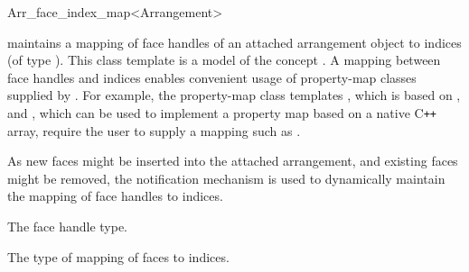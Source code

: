 
\ccRefPageBegin

\begin{ccRefClass}{Arr_face_index_map<Arrangement>}
\label{arr_ref:arr_face_index_map}

\ccDefinition

\ccClassTemplateName{} maintains a mapping of face handles of an
attached arrangement object to indices (of type ).
This class template is a model of the \boost{} concept
. A mapping between face handles and indices
enables convenient usage of property-map classes supplied by \boost{}.
For example, the property-map class templates
, which is based on ,
and , which can be used to implement
a property map based on a native C\hbox{\tt ++} array, require the
user to supply a mapping such as \ccClassTemplateName{}.

As new faces might be inserted into the attached arrangement, and
existing faces might be removed, the notification mechanism is used
to dynamically maintain the mapping of face handles to indices.


\ccIsModel
  
\ccInheritsFrom{}


\ccTypes


\ccGlue
{}
\ccGlue
{}
\ccGlue
{}

    {The face handle type.}

    {The type of mapping of faces to indices.}


\end{ccRefClass}
